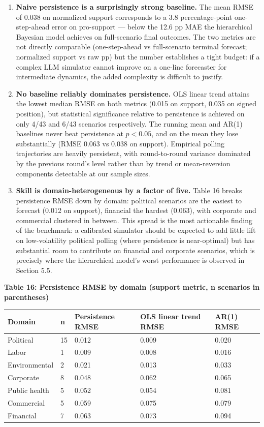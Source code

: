 \documentclass[
]{article}
\begin{document}
\begin{enumerate}
\def\labelenumi{\arabic{enumi}.}
\item
  \textbf{Naive persistence is a surprisingly strong baseline.} The mean
  RMSE of 0.038 on normalized support corresponds to a 3.8
  percentage-point one-step-ahead error on pro-support --- below the
  12.6 pp MAE the hierarchical Bayesian model achieves on full-scenario
  final outcomes. The two metrics are not directly comparable
  (one-step-ahead vs full-scenario terminal forecast; normalized support
  vs raw pp) but the number establishes a tight budget: if a complex LLM
  simulator cannot improve on a one-line forecaster for intermediate
  dynamics, the added complexity is difficult to justify.
\item
  \textbf{No baseline reliably dominates persistence.} OLS linear trend
  attains the lowest median RMSE on both metrics (0.015 on support,
  0.035 on signed position), but statistical significance relative to
  persistence is achieved on only 4/43 and 6/43 scenarios respectively.
  The running mean and AR(1) baselines never beat persistence at
  \(p < 0.05\), and on the mean they lose substantially (RMSE 0.063 vs
  0.038 on support). Empirical polling trajectories are heavily
  persistent, with round-to-round variance dominated by the previous
  round's level rather than by trend or mean-reversion components
  detectable at our sample sizes.
\item
  \textbf{Skill is domain-heterogeneous by a factor of five.} Table 16
  breaks persistence RMSE down by domain: political scenarios are the
  easiest to forecast (0.012 on support), financial the hardest (0.063),
  with corporate and commercial clustered in between. This spread is the
  most actionable finding of the benchmark: a calibrated simulator
  should be expected to add little lift on low-volatility political
  polling (where persistence is near-optimal) but has substantial room
  to contribute on financial and corporate scenarios, which is precisely
  where the hierarchical model's worst performance is observed in
  Section 5.5.
\end{enumerate}

\textbf{Table 16: Persistence RMSE by domain (support metric, n
scenarios in parentheses)}

\begin{longtable}[]{@{}lllll@{}}
\toprule\noalign{}
Domain & n & Persistence RMSE & OLS linear trend RMSE & AR(1) RMSE \\
\midrule\noalign{}
\endhead
\bottomrule\noalign{}
\endlastfoot
Political & 15 & 0.012 & 0.009 & 0.020 \\
Labor & 1 & 0.009 & 0.008 & 0.016 \\
Environmental & 2 & 0.021 & 0.013 & 0.033 \\
Corporate & 8 & 0.048 & 0.062 & 0.065 \\
Public health & 5 & 0.052 & 0.054 & 0.081 \\
Commercial & 5 & 0.059 & 0.075 & 0.079 \\
Financial & 7 & 0.063 & 0.073 & 0.094 \\
\end{longtable}
\end{document}

